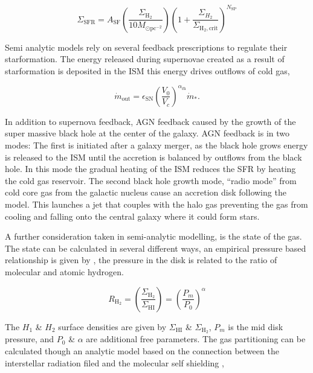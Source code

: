 \begin{equation}
    \Sigma_{\mathrm{SFR}}=A_{\mathrm{SF}}\left(\frac{\Sigma_{\mathrm{H}_{2}}}{10 M_{\odot \mathrm{pc}^{-2}}}\right)\left(1+\frac{\Sigma_{H_{2}}}{\Sigma_{\mathrm{H}_{2}, \mathrm{crit}}}\right)^{N_{\mathrm{SP}}}
\end{equation}

Semi analytic models rely on several feedback prescriptions to regulate their starformation. The energy released during supernovae created as a result of starformation is deposited in the ISM this energy drives outflows of cold gas,

\begin{equation}
    \dot{m}_{\mathrm{out}}=\epsilon_{\mathrm{SN}}\left(\frac{V_{0}}{V_{c}}\right)^{\alpha_{\mathrm{rh}}} \dot{m}_{*}.
\end{equation}

In addition to supernova feedback, AGN feedback caused by the growth of the super massive black hole at the center of the galaxy. AGN feedback is in two modes: The first is initiated after a galaxy merger, as the black hole grows energy is released to the ISM until the accretion is balanced by outflows from the black hole. In this mode the gradual heating of the ISM reduces the SFR by heating the cold gas reservoir. The second black hole growth mode, ``radio mode'' from cold core gas from the galactic nucleus cause an accretion disk following the \citet{Bondi1952OnAccretion} model. This launches a jet that couples with the halo gas preventing the gas from cooling and falling onto the central galaxy where it could form stars.

A further consideration taken in semi-analytic modelling, is the state of the gas. The state can be calculated in several different ways, an empirical pressure based relationship is given by \citet{Blitz2006TheRelation}, the pressure in the disk is related to the ratio of molecular and atomic hydrogen. 

\begin{equation}
    R_{\mathrm{H}_{2}}=\left(\frac{\Sigma_{\mathrm{H}_{2}}}{\Sigma_{\mathrm{HI}}}\right)=\left(\frac{P_{m}}{P_{0}}\right)^{\alpha}
\end{equation}

The $H_1$ \& $H_2$ surface densities are given by $\Sigma_{\mathrm{HI}}$ \& $\Sigma_{\mathrm{H}_{2}}$, $P_m$ is the mid disk pressure, and $P_0$ \& $\alpha$ are additional free parameters. The gas partitioning can be calculated though an analytic model based on the connection between the interstellar radiation filed and the molecular self shielding \citep{Krumholz2008TheClouds,Krumholz2009THEDENSITIES,Krumholz2009THEGAS},

